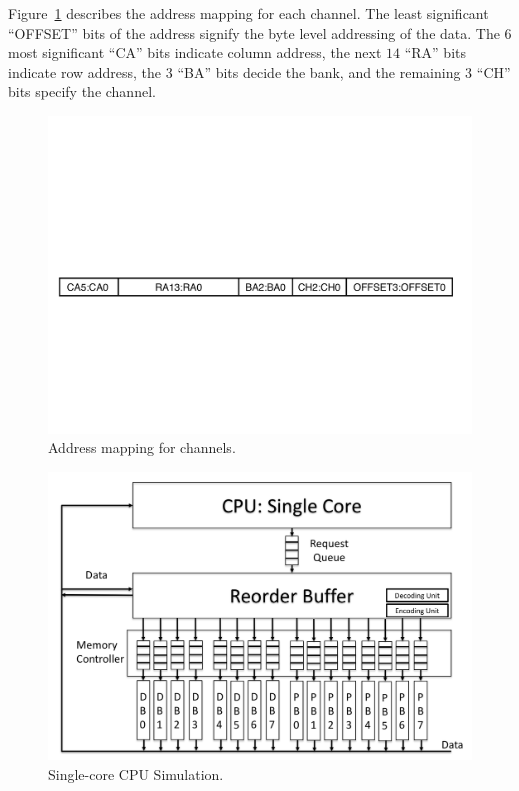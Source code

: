 \begin{remark} %
\label{rem:address}
Figure~\ref{fig:mapping} describes the address mapping for each channel. The least significant ``OFFSET'' bits of the address signify the byte level addressing of the data. The $6$ most significant ``CA'' bits indicate column address, the next $14$ ``RA'' bits indicate row address, the $3$ ``BA'' bits decide the bank, and the remaining $3$ ``CH'' bits specify the channel. 
\end{remark}
\begin{figure}[h!] \centering
\includegraphics[width=0.98\linewidth]{figures/ChAddressing.pdf} 
\caption{Address mapping for channels.}
\label{fig:mapping}
\end{figure}


\begin{figure}[h!] \centering
\includegraphics[width=0.9\linewidth]{figures/single-core-cpu.png} 
\caption{Single-core CPU Simulation.}
\label{fig:single-core-cpu}
\end{figure}

